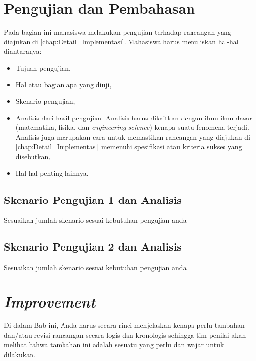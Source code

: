 \section{Pengujian dan Pembahasan}
\label{sec:pengujian}


Pada bagian ini mahasiswa melakukan pengujian terhadap rancangan yang diajukan di \ref{chap:Detail_Implementasi}. Mahasiswa harus menuliskan hal-hal diantaranya: 
\begin{itemize}
    \item Tujuan pengujian,
    \item Hal atau bagian apa yang diuji,
    \item Skenario pengujian,
    \item Analisis dari hasil pengujian. Analisis harus dikaitkan dengan ilmu-ilmu dasar (matematika, fisika, dan \textit{engineering science}) kenapa suatu fenomena terjadi. Analisis juga merupakan cara untuk memastikan rancangan yang diajukan di \ref{chap:Detail_Implementasi} memenuhi spesifikasi atau kriteria sukses yang disebutkan,
    \item Hal-hal penting lainnya.
\end{itemize}

\subsection{Skenario Pengujian 1 dan Analisis}
\label{subsec:Skenario1}
Sesuaikan jumlah skenario sesuai kebutuhan pengujian anda
\subsection{Skenario Pengujian 2 dan Analisis}
\label{subsec:Skenario2}
Sesuaikan jumlah skenario sesuai kebutuhan pengujian anda

\section{\textit{Improvement}}
\label{sec:improvement}
Di dalam Bab ini, Anda harus secara rinci menjelaskan kenapa perlu tambahan dan/atau revisi rancangan secara logis dan kronologis sehingga tim penilai akan melihat bahwa tambahan ini adalah sesuatu yang perlu dan wajar untuk dilakukan. 


